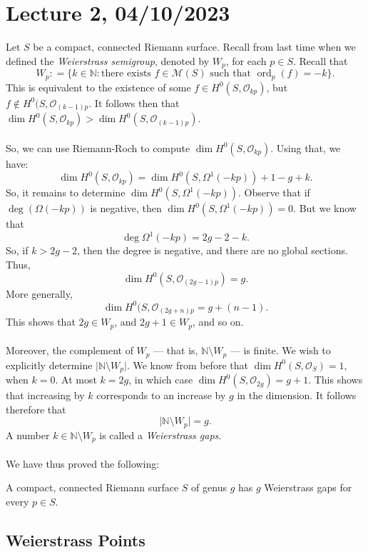 \documentclass[a4paper]{report}
\theoremstyle{definition}
\theoremstyle{remark}
\theoremstyle{proposition}
\theoremstyle{conjecture}
\theoremstyle{lemma}
\theoremstyle{corollary}
\theoremstyle{exercise}
\theoremstyle{example}
\newcommand{\mcal}{\mathcal}
\newcommand{\on}{\operatorname}
\begin{document}
\section{Lecture 2, 04/10/2023}

Let $S$ be a compact, connected Riemann surface. 
Recall from last time when we defined the \emph{Weierstrass semigroup},
denoted by $W_p$, for each $p\in S$. Recall that 
$$W_p: =\lbrace k \in \mathbb{N} : \text{there exists $f\in\mcal{M}(S)$ such that $\on{ord}_p(f) =-k$}\rbrace.$$
This is equivalent to the existence of some $f\in H^0(S,\mcal{O}_{kp})$,
but $f\not\in H^0(S,\mcal{O}_{(k-1)p}.$
It follows then that 
$\dim H^0(S,\mcal{O}_{kp}) > \dim H^0(S,\mcal{O}_{(k-1)p})$.\\\\
So, we can use Riemann-Roch to compute $\dim H^0(S,\mcal{O}_{kp})$.
Using that, we have:
$$\dim H^0(S,\mcal{O}_{kp}) = \dim H^0(S,\Omega^1(-kp)) + 1- g +k.$$
So, it remains to determine $\dim H^0(S,\Omega^1(-kp))$.
Observe that if $\deg(\Omega(-kp))$ is negative, then 
$\dim H^0(S,\Omega^1(-kp)) = 0$. But we know that 
$$\deg\Omega^1(-kp) = 2g-2 -k.$$
So, if $k > 2g-2$, then the degree is negative, and there are no 
global sections.
Thus, 
$$\dim H^0(S,\mcal{O}_{(2g-1)p}) = g.$$
More generally,
$$\dim H^0(S,\mcal{O}_{(2g+n)p} = g + (n-1).$$
This shows that $2g \in W_p$, and $2g+1\in W_p$, and so on.\\\\
Moreover, the complement of $W_p$ --- that is, $\mathbb{N}\setminus W_p$
--- is finite. We wish to explicitly determine 
$\vert\mathbb{N}\setminus W_p\vert$.
We know from before that 
$\dim H^0(S,\mcal{O}_S) = 1$, when $k = 0$. 
At most $k = 2g$, in which case 
$\dim H^0(S,\mcal{O}_{2g}) = g+1$.
This shows that increasing by $k$ corresponds to an increase by $g$ in the 
dimension. It follows therefore that 
$$\vert \mathbb{N}\setminus W_p\vert = g.$$
A number $k\in\mathbb{N}\setminus W_p$
is called a \emph{Weierstrass gaps}.\\\\
We have thus proved the following:
\begin{theorem}
    A compact, connected Riemann surface $S$ of genus $g$
    has $g$ Weierstrass gaps for every $p\in S$.
\end{theorem}

\subsection{Weierstrass Points}
\end{document}
